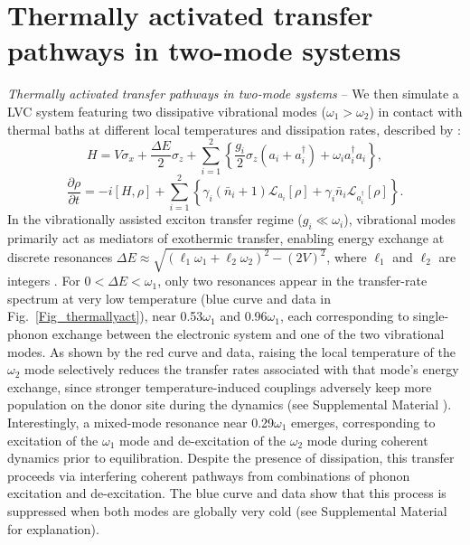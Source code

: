 \documentclass[%
reprint,
superscriptaddress,
amsmath,amssymb,
aps,
prl,
floatfix,
]{revtex4-2}
\begin{document}
\section{Thermally activated transfer pathways in two-mode systems}
\fi
\emph{Thermally activated transfer pathways in two-mode systems} -- We then simulate a LVC system featuring two dissipative vibrational modes ($\omega_1>
\omega_2$) in contact with thermal baths at different local temperatures and dissipation rates, described by \cite{so2025multimode}:
\begin{equation}
    H \!= V\sigma_x\! + \frac{\Delta E}{2}\sigma_z \!+ \sum_{i=1}^2\left\{\frac{g_i}{2}\sigma_z\!\left(a_i+a^\dag_i\right)\!+\omega_i a^\dag_i a_i\right\},
    \label{eq_H2M}
\end{equation}
\begin{equation}
    \frac{\partial\rho}{\partial t}\!=-i[H,\rho] +\sum_{i=1}^2\left\{\gamma_i (\bar{n}_i\!+\!1)\mathcal{L}_{a_i}[\rho] + \gamma_i \bar{n}_i \mathcal{L}_{a^\dagger_i}[\rho]\right\}.
    \label{eq_master2M}
\end{equation}
In the vibrationally assisted exciton transfer regime ($g_i\ll\omega_i$), vibrational modes primarily act as mediators of exothermic transfer, enabling energy exchange at discrete resonances $\Delta E \approx \sqrt{(\ell_1\omega_1 + \ell_2\omega_2)^2-(2V)^2}$, where $\ell_1$ and $\ell_2$ are integers \cite{so2025multimode}. For $0<\Delta E<\omega_1$, only two resonances appear in the transfer-rate spectrum at very low temperature (blue curve and data in Fig.~\ref{Fig_thermallyact}), near 0.53$\omega_1$ and 0.96$\omega_1$, each corresponding to single-phonon exchange between the electronic system and one of the two vibrational modes. As shown by the red curve and data, raising the local temperature of the $\omega_2$ mode selectively reduces the transfer rates associated with that mode’s energy exchange, since stronger temperature-induced couplings adversely keep more population on the donor site during the dynamics (see Supplemental Material \cite{so2025fT_supp}). Interestingly, a mixed-mode resonance near 0.29$\omega_1$ emerges, corresponding to excitation of the $\omega_1$ mode and de-excitation of the $\omega_2$ mode during coherent dynamics prior to equilibration. Despite the presence of dissipation, this transfer proceeds via interfering coherent pathways from combinations of phonon excitation and de-excitation. The blue curve and data show that this process is suppressed when both modes are globally very cold (see Supplemental Material \cite{so2025fT_supp} for explanation).
\end{document}
